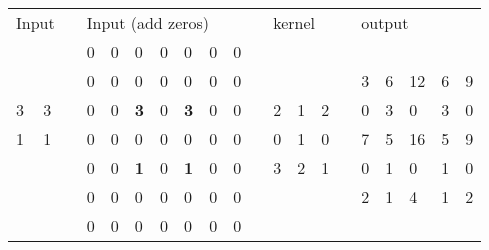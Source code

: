 \begin{SCtable}[\sidecaptionrelwidth][h]
    \begin{tabular}{llllllllllllllllllll}
        \toprule
        \multicolumn{2}{l}{Input} &
           &
          \multicolumn{7}{l}{Input (add zeros)} &
           &
          \multicolumn{3}{l}{kernel} &
           &
          \multicolumn{5}{l}{output} \\ \cline{4-6}
         &
           &
          \multicolumn{1}{l|}{} &
          0 &
          0 &
          \multicolumn{1}{l|}{0} &
          0 &
          0 &
          0 &
          0 &
           &
           &
           &
           &
           &
           &
           &
           &
           &
           \\ \cline{16-16}
         &
           &
          \multicolumn{1}{l|}{} &
          0 &
          0 &
          \multicolumn{1}{l|}{0} &
          0 &
          0 &
          0 &
          0 &
           &
           &
           &
           &
          \multicolumn{1}{l|}{} &
          \multicolumn{1}{l|}{3} &
          6 &
          12 &
          6 &
          9 \\ \cline{12-14} \cline{16-16}
        3 &
          3 &
          \multicolumn{1}{l|}{} &
          0 &
          0 &
          \multicolumn{1}{l|}{\textbf{3}} &
          0 &
          \textbf{3} &
          0 &
          0 &
          \multicolumn{1}{l|}{} &
          2 &
          1 &
          \multicolumn{1}{l|}{2} &
           &
          0 &
          3 &
          0 &
          3 &
          0 \\ \cline{4-6}
        1 &
          1 &
           &
          0 &
          0 &
          0 &
          0 &
          0 &
          0 &
          0 &
          \multicolumn{1}{l|}{} &
          0 &
          1 &
          \multicolumn{1}{l|}{0} &
           &
          7 &
          5 &
          16 &
          5 &
          9 \\
         &
           &
           &
          0 &
          0 &
          \textbf{1} &
          0 &
          \textbf{1} &
          0 &
          0 &
          \multicolumn{1}{l|}{} &
          3 &
          2 &
          \multicolumn{1}{l|}{1} &
           &
          0 &
          1 &
          0 &
          1 &
          0 \\ \cline{12-14}
         &
           &
           &
          0 &
          0 &
          0 &
          0 &
          0 &
          0 &
          0 &
           &
           &
           &
           &
           &
          2 &
          1 &
          4 &
          1 &
          2 \\
         &
           &
           &
          0 &
          0 &
          0 &
          0 &
          0 &
          0 &
          0 &
           &
           &
           &
           &
           &
           &
           &
           &
           & \\ \bottomrule
          

\end{tabular}
\end{SCtable}
